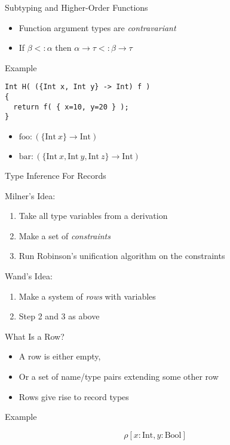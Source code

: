 \documentclass{beamer}
\newcommand{\arr}{\rightarrow}
\newcommand{\oftype}[2]{#1\!:\!#2}
\begin{document}
\begin{frame}[fragile]{Subtyping and Higher-Order Functions}

\onslide<+->
\begin{itemize}
  \item Function argument types are \emph{contravariant}
  \item If $\beta <: \alpha$ then $\alpha \arr \tau <: \beta \arr \tau$
\end{itemize}

\onslide<+->

Example

\begin{verbatim}
Int H( ({Int x, Int y} -> Int) f )
{
  return f( { x=10, y=20 } );
}
\end{verbatim}

\begin{itemize}
  \item $\text{foo} : (\{\text{Int}\ x\} \arr \text{Int})$
  \item $\text{bar} : (\{\text{Int}\ x, \text{Int}\ y, \text{Int}\ z\} \arr \text{Int})$
\end{itemize}

\end{frame}


\begin{frame}{Type Inference For Records}

\onslide<+->

Milner's Idea:

\begin{enumerate}
  \item Take all type variables from a derivation
  \item Make a set of \emph{constraints}
  \item Run Robinson's unification algorithm on the constraints
\end{enumerate}

\onslide<+->

Wand's Idea:

\begin{enumerate}
  \item Make a system of \emph{rows} with variables
  \item Step 2 and 3 as above
\end{enumerate}

\end{frame}


\begin{frame}{What Is a Row?}

\begin{itemize}
  \item A row is either empty,
  \item Or a set of name/type pairs extending some other row
  \item Rows give rise to record types
\end{itemize}

Example

\begin{equation*}
  \rho[\oftype{x}{\text{Int}}, \oftype{y}{\text{Bool}}]
\end{equation*}

\end{frame}
\end{document}
